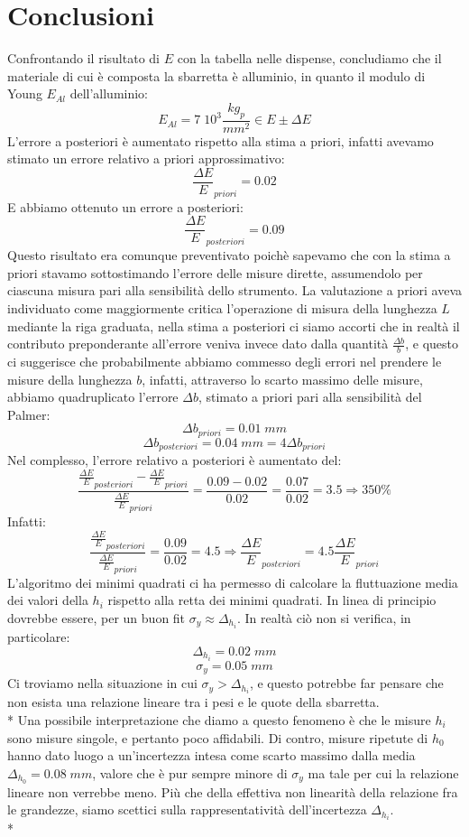 \documentclass[10pt,a4paper]{book}
\begin{document}
\section*{Conclusioni}
Confrontando il risultato di $E$ con la tabella nelle dispense, concludiamo che il materiale di cui è composta la sbarretta è alluminio, in quanto il modulo di Young $E_{Al}$ dell'alluminio:
$$
E_{Al} = 7\;10^3 \frac{kg_p}{mm^2} \in E \pm \Delta E
$$
L'errore a posteriori è aumentato rispetto alla stima a priori, infatti avevamo stimato un errore relativo a priori approssimativo:
$$
\frac{\Delta E}{E}_{priori} = 0.02
$$
E abbiamo ottenuto un errore a posteriori:
$$
\frac{\Delta E}{E}_{posteriori} = 0.09
$$
Questo risultato era comunque preventivato poichè sapevamo che con la stima a priori stavamo sottostimando l'errore delle misure dirette, assumendolo per ciascuna misura pari alla sensibilità dello strumento. La valutazione a priori aveva individuato come maggiormente critica l'operazione di misura della lunghezza $L$ mediante la riga graduata, nella stima a posteriori ci siamo accorti che in realtà il contributo preponderante all'errore veniva invece dato dalla quantità $\frac{\Delta b}{b}$, e questo ci suggerisce che probabilmente abbiamo commesso degli errori nel prendere le misure della lunghezza $b$, infatti, attraverso lo scarto massimo delle misure, abbiamo quadruplicato l'errore $\Delta b$, stimato a priori pari alla sensibilità del Palmer:
$$
\Delta b_{priori} = 0.01\;mm
$$
$$
\Delta b_{posteriori} = 0.04\;mm = 4\Delta b_{priori}
$$
Nel complesso, l'errore relativo a posteriori è aumentato del:
$$
\frac{\frac{\Delta E}{E}_{posteriori} - \frac{\Delta E}{E}_{priori}}{\frac{\Delta E}{E}_{priori}} = \frac{0.09 - 0.02}{0.02} = \frac{0.07}{0.02} = 3.5 \Rightarrow 350\%
$$
Infatti:
$$
\frac{\frac{\Delta E}{E}_{posteriori}}{\frac{\Delta E}{E}_{priori}} = \frac{0.09}{0.02} = 4.5 \Rightarrow \frac{\Delta E}{E}_{posteriori} = 4.5\frac{\Delta E}{E}_{priori}
$$
L'algoritmo dei minimi quadrati ci ha permesso di calcolare la fluttuazione media dei valori della $h_i$ rispetto alla retta dei minimi quadrati. In linea di principio dovrebbe essere, per un buon fit $\sigma_y \approx \Delta_{h_i}$. In realtà ciò non si verifica, in particolare:
$$
\Delta_{h_i} = 0.02\;mm
$$
$$
\sigma_y = 0.05\;mm
$$
Ci troviamo nella situazione in cui $\sigma_y > \Delta_{h_i}$, e questo potrebbe far pensare che non esista una relazione lineare tra i pesi e le quote della sbarretta.\\*
Una possibile interpretazione che diamo a questo fenomeno è che le misure $h_i$ sono misure singole, e pertanto poco affidabili. Di contro, misure ripetute di $h_0$ hanno dato luogo a un'incertezza intesa come scarto massimo dalla media $\Delta_{h_0} = 0.08\;mm$, valore che è pur sempre minore di $\sigma_y$ ma tale per cui la relazione lineare non verrebbe meno. Più che della effettiva non linearità della relazione fra le grandezze, siamo scettici sulla rappresentatività dell'incertezza $\Delta_{h_i}$.\\*
\end{document}
